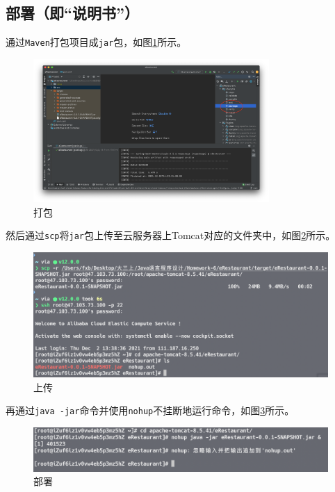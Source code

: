 \documentclass[11pt]{homework}
\begin{document}
  \subsection*{部署（即“说明书”）}

  通过\verb|Maven|打包项目成\verb|jar|包，如图\ref{打包}所示。
  \begin{figure}[htb]
    \centering
    \includegraphics[width=0.8\textwidth]{打包}
    \caption{打包}
    \label{打包}
  \end{figure}

  
  然后通过\verb|scp|将\verb|jar|包上传至云服务器上Tomcat对应的文件夹中，如图\ref{上传}所示。
  \begin{figure}[htb]
    \centering
    \includegraphics[width=\textwidth]{上传}
    \caption{上传}
    \label{上传}
  \end{figure}
  
  再通过\verb|java -jar|命令并使用\verb|nohup|不挂断地运行命令，如图\ref{部署}所示。
  \begin{figure}[htb]
    \centering
    \includegraphics[width=\textwidth]{部署}
    \caption{部署}
    \label{部署}
  \end{figure}
\end{document}
